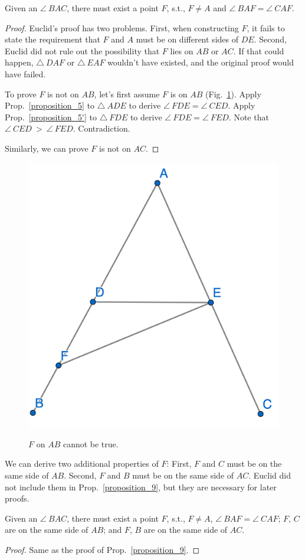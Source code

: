 \begin{proposition}\label{proposition_9}\leanok
    Given an $\angle~BAC$, there must exist a point $F$, s.t., $F \neq A$ and $\angle~BAF = \angle~CAF$.
\end{proposition}
\begin{proof}
    \leanok
    Euclid's proof has two problems. First, when constructing $F$, it fails to state the requirement that $F$ and $A$ must be on different sides of $DE$.
    Second, Euclid did not rule out the possibility that $F$ lies on $AB$ or $AC$. If that could happen, 
    $\triangle~DAF$ or $\triangle~EAF$ wouldn't have existed, and the original proof would have failed.

    To prove $F$ is not on $AB$, let's first assume $F$ is on $AB$ (Fig.~\ref{fig:prop_9}). Apply Prop.~\ref{proposition_5} to $\triangle~ADE$ to derive $\angle~FDE = \angle~CED$. Apply Prop.~\ref{proposition_5'} to $\triangle~FDE$ to derive $\angle~FDE = \angle~FED$. Note that $\angle~CED~>~\angle~FED$. Contradiction.

    Similarly, we can prove $F$ is not on $AC$.
\end{proof}

\begin{figure}[ht]
    \begin{center}
    \includegraphics[width=0.5\linewidth]{figures/proposition_9.png}
    \label{fig:prop_9}
    \caption{$F$ on $AB$ cannot be true.}
    \end{center}
\end{figure}

We can derive two additional properties of $F$: First, $F$ and $C$ must be on the same side of $AB$. Second, $F$ and $B$ must be on the same side of $AC$. 
Euclid did not include them in Prop.~\ref{proposition_9}, but they are necessary for later proofs.

\begin{proposition}\label{proposition_9'}\leanok
    Given an $\angle~BAC$, there must exist a point $F$, s.t., $F \neq A$, $\angle~BAF = \angle~CAF$; $F$, $C$ are on the same side of $AB$; and $F$, $B$ are on the same side of $AC$.
\end{proposition}
\begin{proof}
    \leanok
    Same as the proof of Prop.~\ref{proposition_9}.
\end{proof}